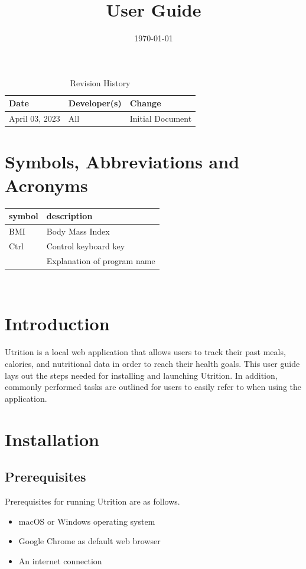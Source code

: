 \documentclass{article}
\title{User Guide\\\progname}
\author{\authname}
\date{\today}
\begin{document}
\begin{table}[hp]
\caption{Revision History} \label{TblRevisionHistory}
\begin{tabularx}{\textwidth}{llX}
\toprule
\textbf{Date} & \textbf{Developer(s)} & \textbf{Change}\\
\midrule
April 03, 2023 & All & Initial Document\\
\bottomrule
\end{tabularx}
\end{table}

\newpage

\maketitle
\newpage
\tableofcontents
\listoffigures
\newpage

\section{Symbols, Abbreviations and Acronyms}

\renewcommand{\arraystretch}{1.2}
\begin{tabular}{l l} 
	\toprule		
	\textbf{symbol} & \textbf{description}\\
	\midrule 
	BMI & Body Mass Index\\
	Ctrl & Control keyboard key\\
	\progname & Explanation of program name\\
	\bottomrule
\end{tabular}\\

\section{Introduction}

Utrition is a local web application that allows users to track their past meals, calories, and nutritional data in order to reach their health goals. This user guide lays out the steps needed for installing and launching Utrition. In addition, commonly performed tasks are outlined for users to easily refer to when using the application.

\section{Installation}
\subsection{Prerequisites}
Prerequisites for running Utrition are as follows.
\begin{itemize}
	\item macOS or Windows operating system
	\item Google Chrome as default web browser
	\item An internet connection
\end{itemize}
\end{document}
